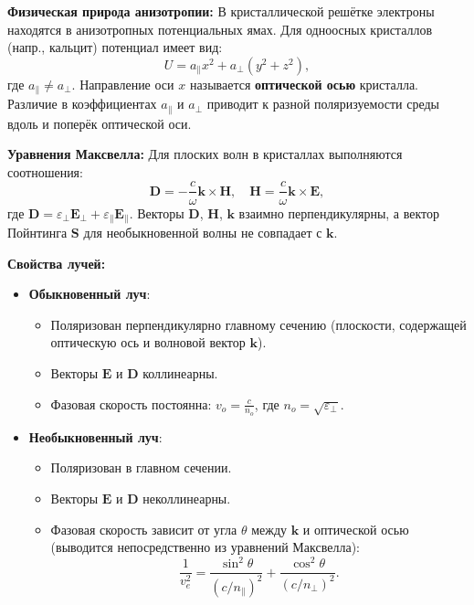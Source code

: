 \textbf{Физическая природа анизотропии:}  
В кристаллической решётке электроны находятся в анизотропных потенциальных ямах. Для одноосных кристаллов (напр., кальцит) потенциал имеет вид:
\begin{equation}
    U = a_{\parallel}x^2 + a_{\perp}(y^2 + z^2),
\end{equation}
где \( a_{\parallel} \neq a_{\perp} \). Направление оси \( x \) называется \textbf{оптической осью} кристалла. Различие в коэффициентах \( a_{\parallel} \) и \( a_{\perp} \) приводит к разной поляризуемости среды вдоль и поперёк оптической оси.

\textbf{Уравнения Максвелла:}  
Для плоских волн в кристаллах выполняются соотношения:
\begin{equation}
    \mathbf{D} = -\frac{c}{\omega} \mathbf{k} \times \mathbf{H}, \quad \mathbf{H} = \frac{c}{\omega} \mathbf{k} \times \mathbf{E},
\end{equation}
где \( \mathbf{D} = \varepsilon_{\perp}\mathbf{E}_{\perp} + \varepsilon_{\parallel}\mathbf{E}_{\parallel} \). Векторы \( \mathbf{D} \), \( \mathbf{H} \), \( \mathbf{k} \) взаимно перпендикулярны, а вектор Пойнтинга \( \mathbf{S} \) для необыкновенной волны не совпадает с \( \mathbf{k} \).

\textbf{Свойства лучей:}  
\begin{itemize}
    \item \textbf{Обыкновенный луч}:
    \begin{itemize}
        \item Поляризован перпендикулярно главному сечению (плоскости, содержащей оптическую ось и волновой вектор \( \mathbf{k} \)).
        \item Векторы \( \mathbf{E} \) и \( \mathbf{D} \) коллинеарны.
        \item Фазовая скорость постоянна: \( v_o = \frac{c}{n_o} \), где \( n_o = \sqrt{\varepsilon_{\perp}} \).
    \end{itemize}
    
    \item \textbf{Необыкновенный луч}:
    \begin{itemize}
        \item Поляризован в главном сечении.
        \item Векторы \( \mathbf{E} \) и \( \mathbf{D} \) неколлинеарны.
        \item Фазовая скорость зависит от угла \( \theta \) между \( \mathbf{k} \) и оптической осью (выводится непосредственно из уравнений Максвелла):
        \begin{equation}
            \frac{1}{v_e^2} = \frac{\sin^2\theta}{(c/n_{\parallel})^2} + \frac{\cos^2\theta}{(c/n_{\perp})^2}.
        \end{equation}
    \end{itemize}
\end{itemize}
